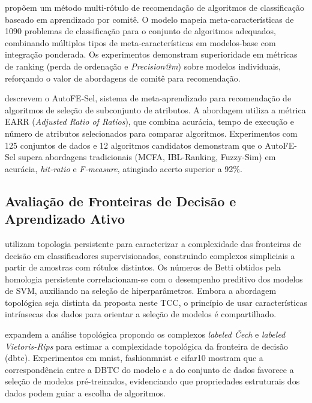  propõem um método multi-rótulo de recomendação de algoritmos de classificação baseado em aprendizado por comitê. O modelo mapeia meta-características de 1090 problemas de classificação para o conjunto de algoritmos adequados, combinando múltiplos tipos de meta-características em modelos-base com integração ponderada. Os experimentos demonstram superioridade em métricas de ranking (perda de ordenação e \textit{Precision@m}) sobre modelos individuais, reforçando o valor de abordagens de comitê para recomendação.

 descrevem o AutoFE-Sel, sistema de meta-aprendizado para recomendação de algoritmos de seleção de subconjunto de atributos. A abordagem utiliza a métrica EARR (\textit{Adjusted Ratio of Ratios}), que combina acurácia, tempo de execução e número de atributos selecionados para comparar algoritmos. Experimentos com 125 conjuntos de dados e 12 algoritmos candidatos demonstram que o AutoFE-Sel supera abordagens tradicionais (MCFA, IBL-Ranking, Fuzzy-Sim) em acurácia, \textit{hit-ratio} e \textit{F-measure}, atingindo acerto superior a 92\%.

\subsection{Avaliação de Fronteiras de Decisão e Aprendizado Ativo}
\label{sec:relFronteirasAtivo}

 utilizam topologia persistente para caracterizar a complexidade das fronteiras de decisão em classificadores supervisionados, construindo complexos simpliciais a partir de amostras com rótulos distintos. Os números de Betti obtidos pela homologia persistente correlacionam-se com o desempenho preditivo dos modelos de SVM, auxiliando na seleção de hiperparâmetros. Embora a abordagem topológica seja distinta da proposta neste TCC, o princípio de usar características intrínsecas dos dados para orientar a seleção de modelos é compartilhado.

 expandem a análise topológica propondo os complexos \textit{labeled Čech} e \textit{labeled Vietoris-Rips} para estimar a complexidade topológica da fronteira de decisão (\gls{dbtc}). Experimentos em \gls{mnist}, \gls{fashionmnist} e \gls{cifar10} mostram que a correspondência entre a DBTC do modelo e a do conjunto de dados favorece a seleção de modelos pré-treinados, evidenciando que propriedades estruturais dos dados podem guiar a escolha de algoritmos.

